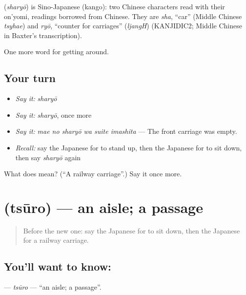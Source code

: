 \begin{cousinweb}
\textbf{} (\emph{sharyō}) is Sino-Japanese (kango): two Chinese characters read with their on'yomi, readings borrowed from Chinese. They are \emph{sha}, \textquotedblleft{}car\textquotedblright{} (Middle Chinese \emph{tsyhae}) and \emph{ryō}, \textquotedblleft{}counter for carriages\textquotedblright{} (\emph{ljangH}) (KANJIDIC2; Middle Chinese in Baxter's transcription).
\end{cousinweb}

\begin{grammarlens}[title={What you've built}]
One more word for getting around.
\end{grammarlens}

\subsection*{Your turn}
\begin{itemize}
\raggedright
  \item \emph{Say it:} \emph{sharyō}
  \item \emph{Say it:} \emph{sharyō}, once more
  \item \emph{Say it:} \emph{mae no sharyō wa suite imashita} — The front carriage was empty.
  \item \emph{Recall:} say the Japanese for to stand up, then the Japanese for to sit down, then say \emph{sharyō} again
\end{itemize}

\begin{tcolorbox}[breakable,colback=teal!4,colframe=teal!35!black,title={Before you move on}]
What does  mean? (\textquotedblleft{}A railway carriage\textquotedblright{}.) Say it once more.
\end{tcolorbox}
\section[\texorpdfstring{\ja{つうろ} (tsūro)}{つうろ (tsūro)}]{ (tsūro) — an aisle; a passage}

\label{lesson:JA-C379-tsuuro}



\begin{quote}
Before the new one: say the Japanese for to sit down, then the Japanese for a railway carriage.
\end{quote}

\subsection*{You'll want to know: }
\textbf{} — \emph{tsūro} — \textquotedblleft{}an aisle; a passage\textquotedblright{}.

